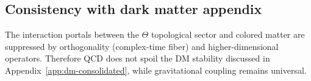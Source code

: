 \subsection{Consistency with dark matter appendix}
The interaction portals between the $\Theta$ topological sector and colored matter are suppressed by orthogonality (complex-time fiber)
and higher-dimensional operators. Therefore QCD does not spoil the DM stability discussed in Appendix~\ref{app:dm-consolidated}, while gravitational coupling remains universal.
